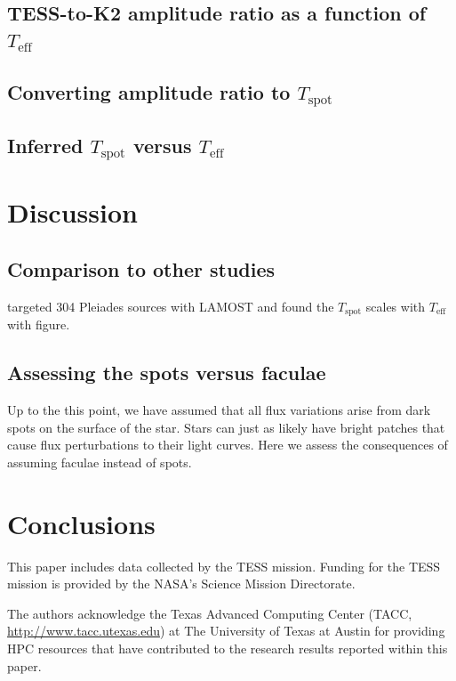 \documentclass[modern]{aastex631}
\begin{document}
\subsection{TESS-to-K2 amplitude ratio as a function of $T_{\mathrm{eff}}$}

\subsection{Converting amplitude ratio to $T_{\mathrm{spot}}$}

\subsection{Inferred $T_{\mathrm{spot}}$ versus $T_{\mathrm{eff}}$}



\section{Discussion}

\subsection{Comparison to other studies}
\citet{2016MNRAS.463.2494F} targeted 304 Pleiades sources with LAMOST and found the $T_{\mathrm{spot}}$ scales with $T_{\mathrm{eff}}$ with figure.

\subsection{Assessing the spots versus faculae}
Up to the this point, we have assumed that all flux variations arise from dark spots on the surface of the star. Stars can just as likely have bright patches that cause flux perturbations to their light curves. Here we assess the consequences of assuming faculae instead of spots.

\section{Conclusions}

\begin{acknowledgements}
  This paper includes data collected by the TESS mission. Funding for the TESS mission is provided by the NASA's Science Mission Directorate.

  The authors acknowledge the Texas Advanced Computing Center (TACC, \url{http://www.tacc.utexas.edu}) at The University of Texas at Austin for providing HPC resources that have contributed to the research results reported within this paper.
\end{acknowledgements}
\end{document}
